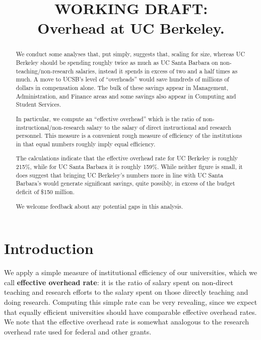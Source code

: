 \documentclass[11pt]{article}
\title{{\bf WORKING DRAFT:}\\  Overhead at UC Berkeley.}
\author{}
\begin{document}
\maketitle

\begin{abstract}

We conduct some analyses that, put simply, suggests that, scaling for size, whereas UC
Berkeley should be spending roughly twice as much as UC Santa Barbara
on non-teaching/non-research salaries, instead it spends in excess of two and
a half times as much.  A move to UCSB's level of
``overheads'' would save hundreds of millions of dollars in
compensation alone.  The bulk of these savings appear in Management,
Administration, and Finance areas and some savings also appear in
Computing and Student Services.

In particular, we compute an ``effective overhead'' which is the ratio
of non-instructional/non-research salary to the salary of direct
instructional and research personnel. This measure is a convenient
rough measure of efficiency of the institutions in that equal numbers
roughly imply equal efficiency. 

The calculations indicate that the effective overhead rate for UC
Berkeley is roughly 215\%, while for UC Santa Barbara it is roughly
159\%. While neither figure is small, it does suggest that bringing UC
Berkeley's numbers more in line with UC Santa Barbara's would generate
significant savings, quite possibly, in excess of the budget deficit
of \$150 million.

We welcome feedback about any potential gaps in this analysis.

\end{abstract}

\section{Introduction}

We apply a simple measure of institutional efficiency of our universities,
which we call {\bf effective overhead rate}: it is the ratio of salary
spent on non-direct teaching and research efforts to the salary spent
on those directly teaching and doing research. Computing this simple rate can 
be very revealing, since we expect that equally
efficient universities should have comparable effective overhead rates.
We note that the effective overhead rate is somewhat analogous to 
the research overhead rate used for federal and other grants.
\end{document}
